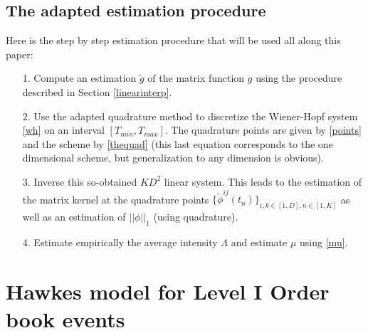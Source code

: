 \documentclass[a4paper,11pt]{article}
\begin{document}
\subsection{The adapted estimation procedure}
\label{thealgo}
Here is the step by step estimation procedure that will be used all along this paper:
\begin{itemize}
\item[1.] Compute an estimation $\tilde g$ of the matrix function $g$ using
the procedure described in Section \ref{linearinterp}.
\item[2.] Use the adapted quadrature method to discretize the Wiener-Hopf system \eqref{wh}
on an interval $[T_{min},T_{max}]$. The quadrature points are given by \eqref{points} and the scheme by \eqref{thequad} (this last equation corresponds to the one dimensional scheme, but generalization to any dimension is obvious).
\item[3.] Inverse this so-obtained $KD^2$ linear system. This leads to the estimation of the matrix kernel at the quadrature points
$\{\tilde \phi^{ij}(t_n)\}_{i,k\in[1,D],n \in [1,K]}$ as well as an estimation of $||\phi||_1$ (using quadrature).
\item[4.] Estimate empirically the average intensity $\Lambda$ and estimate $\mu$ using \eqref{mu}.
\end{itemize}

\section{Hawkes model for Level I Order book events}
\label{s3}
\end{document}
